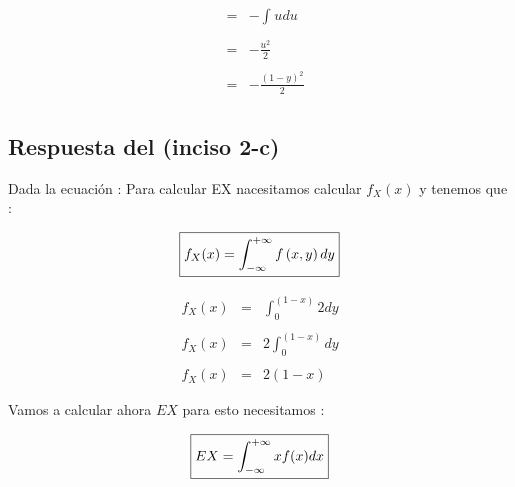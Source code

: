 \documentclass[12pt]{article}
\begin{document}
\begin{center}
\begin{equation*}
\begin{array}{c|c}
\begin{array}{l}
\begin{array}{rcl}
                        & = &  \displaystyle -\int_{}^{}u du
                        \\
                        \\
                        & = & \displaystyle - \frac{u^2}{2}
                        \\
                        \\
                        & = & \displaystyle -\frac{\left(1-y\right)^2}{2}
                    \end{array}
                \end{array}
            \end{array}
        \end{equation*}
    \end{center}


    \subsection*{Respuesta del (inciso 2-c)}
    \begin{flushleft}
        Dada la ecuaci\'on :  Para calcular EX nacesitamos calcular $ f_X (x) $ y tenemos que :
    \end{flushleft}
  
    \begin{equation*}
        \fbox{$
            \displaystyle f_X(x)=\int_{-\infty}^{+\infty} f\left(x,y\right) dy
        $} 
    \end{equation*}
          
    \begin{equation}
        \begin{array}{rcl}
            f_X(x) & = & \displaystyle  \int_{0}^{\left(1-x\right)} 2 dy
            \\
            \\
            f_X(x) & = & \displaystyle 2\int_{0}^{\left(1-x\right)}dy
            \\
            \\
            f_X(x) & = & \displaystyle 2\left(1-x\right)
        \end{array}
    \end{equation}
    
    \begin{flushleft}
        Vamos a calcular ahora $EX$ para esto necesitamos  :  
    \end{flushleft}
     
    \begin{equation*}
        \fbox{$
            EX = \displaystyle\int_{-\infty}^{+\infty}x f(x) dx
        $}
    \end{equation*}
      
\end{document}
